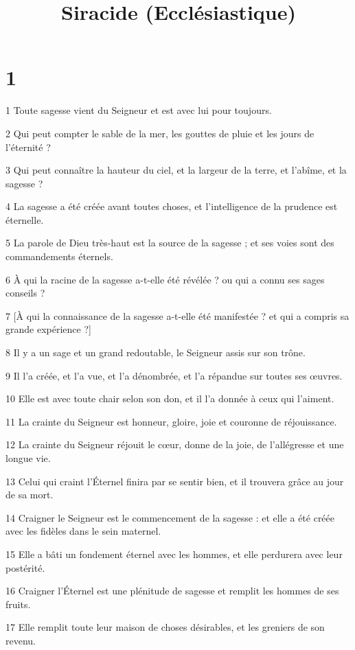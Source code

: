 

\title{Siracide (Ecclésiastique)}


\chapter{1}

\par 1 Toute sagesse vient du Seigneur et est avec lui pour toujours.
\par 2 Qui peut compter le sable de la mer, les gouttes de pluie et les jours de l'éternité ?
\par 3 Qui peut connaître la hauteur du ciel, et la largeur de la terre, et l'abîme, et la sagesse ?
\par 4 La sagesse a été créée avant toutes choses, et l'intelligence de la prudence est éternelle.
\par 5 La parole de Dieu très-haut est la source de la sagesse ; et ses voies sont des commandements éternels.
\par 6 À qui la racine de la sagesse a-t-elle été révélée ? ou qui a connu ses sages conseils ?
\par 7 [À qui la connaissance de la sagesse a-t-elle été manifestée ? et qui a compris sa grande expérience ?]
\par 8 Il y a un sage et un grand redoutable, le Seigneur assis sur son trône.
\par 9 Il l'a créée, et l'a vue, et l'a dénombrée, et l'a répandue sur toutes ses œuvres.
\par 10 Elle est avec toute chair selon son don, et il l'a donnée à ceux qui l'aiment.
\par 11 La crainte du Seigneur est honneur, gloire, joie et couronne de réjouissance.
\par 12 La crainte du Seigneur réjouit le cœur, donne de la joie, de l'allégresse et une longue vie.
\par 13 Celui qui craint l'Éternel finira par se sentir bien, et il trouvera grâce au jour de sa mort.
\par 14 Craigner le Seigneur est le commencement de la sagesse : et elle a été créée avec les fidèles dans le sein maternel.
\par 15 Elle a bâti un fondement éternel avec les hommes, et elle perdurera avec leur postérité.
\par 16 Craigner l'Éternel est une plénitude de sagesse et remplit les hommes de ses fruits.
\par 17 Elle remplit toute leur maison de choses désirables, et les greniers de son revenu.
